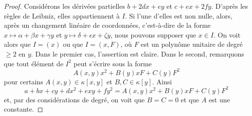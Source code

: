 \begin{proof} Considérons les dérivées partielles $b + 2dx + ey$ et $c + ex + 2fy$. D'après les règles de Leibniz, elles appartiennent à $I$. Si l'une d'elles est non nulle, alors, après un changement linéaire de coordonnées, c'est-à-dire de la forme $x \mapsto \alpha + \beta x + \gamma y$ et $y \mapsto \delta + \epsilon x + \zeta y$, nous pouvons supposer que $x \in I$. On voit alors que $I = (x)$ ou que $I = (x, F)$, où $F$ est un polynôme unitaire de degré $\geq 2$ en $y$. Dans le premier cas, l'assertion est claire. Dans le second, remarquons que tout élément de $I^2$ peut s'écrire sous la forme $$
A(x, y) x^2 + B(y) x F + C(y) F^2
$$ pour certains $A(x, y) \in \kappa[x, y]$ et $B, C \in \kappa[y]$. Ainsi $$
a + b x + c y + d x^2 + exy + f y^2 = A(x, y) x^2 + B(y) x F + C(y) F^2
$$ et, par des considérations de degré, on voit que $B = C = 0$ et que $A$ est une constante.


\end{proof}
